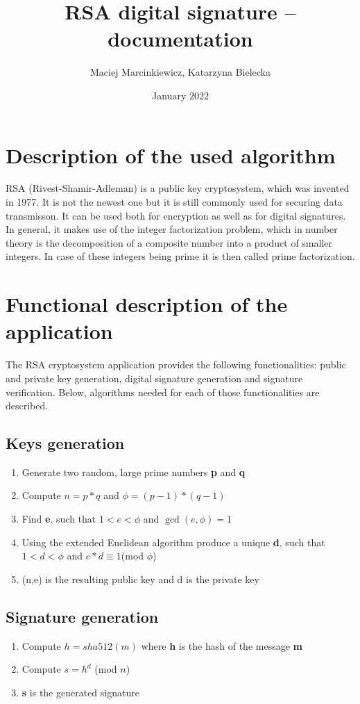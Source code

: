 \documentclass{article}
\title{ RSA digital signature -- documentation}
\author{Maciej Marcinkiewicz, Katarzyna Bielecka}
\date{\nth{20} January 2022}
\begin{document}
\maketitle

\section{Description of the used algorithm}
RSA (Rivest-Shamir-Adleman) is a public key cryptosystem, which was invented in 1977. It is not the newest one but it is still commonly used for securing data transmisson.
It can be used both for encryption as well as for digital signatures. In general, it makes use of the integer factorization problem, which in number theory is the decomposition of a composite number into a product of smaller integers. In case of these integers being prime it is then called prime factorization.  

\section{Functional description of the application}
The RSA cryptosystem application provides the following functionalities:
public and private key generation, digital signature generation and signature verification.
Below, algorithms needed for each of those functionalities are described.

\subsection{Keys generation}
\begin{enumerate}
    \item Generate two random, large prime numbers \textbf{p} and \textbf{q}
    \item Compute $ n = p*q $  and $ \phi = (p - 1)*(q - 1) $
    \item Find \textbf{e}, such that  $ 1 < e < \phi$ and $\gcd(e,\phi) = 1 $
    \item Using the extended Euclidean algorithm produce a unique \textbf{d}, such that $ 1 < d < \phi $  and $ e*d \equiv  1 $(mod $\phi$)  
    \item (n,e) is the resulting public key and d is the private key
\end{enumerate}

\subsection{Signature generation}
\begin{enumerate}
    \item Compute $  h = sha512(m) $ where \textbf{h} is the hash of the message \textbf{m}  
    \item Compute $ s = h^d $ (mod $n$)
    \item \textbf{s} is the generated signature
\end{enumerate}
\end{document}
